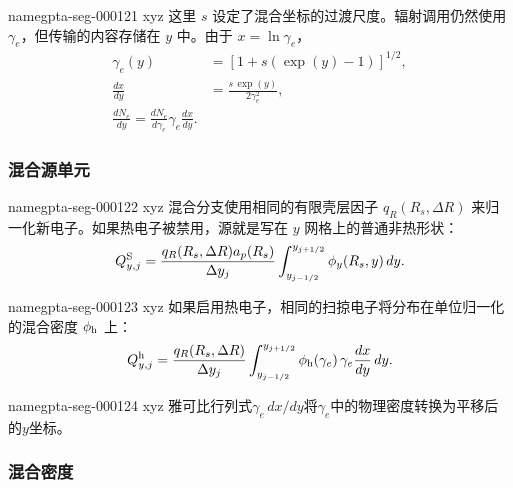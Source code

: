 \documentclass[twocolumn]{aastex702}
\makeatletter
\providecommand{\gptareaderanchor}[1]{\pdfdest name{#1} xyz}%
\providecommand{\gptareaderanchor}[1]{\special{pdf:dest (#1) [ @thispage /XYZ @xpos @ypos null ]}}%
\makeatother
\begin{document}
\gptareaderanchor{gpta-seg-000121}%
这里 \(s\) 设定了混合坐标的过渡尺度。辐射调用仍然使用 \(\gamma_e\)，但传输的内容存储在 \(y\) 中。由于 \(x=\ln\gamma_e\)，
\begin{equation}
\begin{aligned}
\gamma_e(y)&=\left[1+s(\exp(y)-1)\right]^{1/2},\\
\frac{dx}{dy}&=\frac{s\,\exp(y)}{2\gamma_e^2},\\
\frac{dN_e}{dy}=\frac{dN_e}{d\gamma_e}\gamma_e\frac{dx}{dy}.
\end{aligned}
\end{equation}

\subsubsection{混合源单元}


\gptareaderanchor{gpta-seg-000122}%
混合分支使用相同的有限壳层因子 \(q_R(R_s,\Delta R)\) 来归一化新电子。如果热电子被禁用，源就是写在 \(y\) 网格上的普通非热形状：
\begin{equation}
Q_{y,j}^{\rm S}
=\frac{q_R(R_s,\Delta R)a_p(R_s)}{\Delta y_j}
\int_{y_{j-1/2}}^{y_{j+1/2}}\phi_y(R_s,y)\,dy .
\end{equation}

\gptareaderanchor{gpta-seg-000123}%
如果启用热电子，相同的扫掠电子将分布在单位归一化的混合密度 \(\phi_{\rm h}\) 上：
\begin{equation}
Q_{y,j}^{\rm h}=
\frac{q_R(R_s,\Delta R)}{\Delta y_j}
\int_{y_{j-1/2}}^{y_{j+1/2}}
\phi_{\rm h}(\gamma_e)\,
\gamma_e\frac{dx}{dy}\,dy .
\end{equation}

\gptareaderanchor{gpta-seg-000124}%
雅可比行列式\(\gamma_e\,dx/dy\)将\(\gamma_e\)中的物理密度转换为平移后的\(y\)坐标。

\subsubsection{混合密度}
\end{document}
